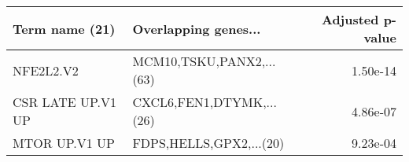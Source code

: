 \begin{tabular}{llr}
\toprule
   Term name (21) &     Overlapping genes... &  Adjusted p-value \\
\midrule
        NFE2L2.V2 & MCM10,TSKU,PANX2,...(63) &          1.50e-14 \\
CSR LATE UP.V1 UP & CXCL6,FEN1,DTYMK,...(26) &          4.86e-07 \\
    MTOR UP.V1 UP &  FDPS,HELLS,GPX2,...(20) &          9.23e-04 \\
\bottomrule
\end{tabular}
